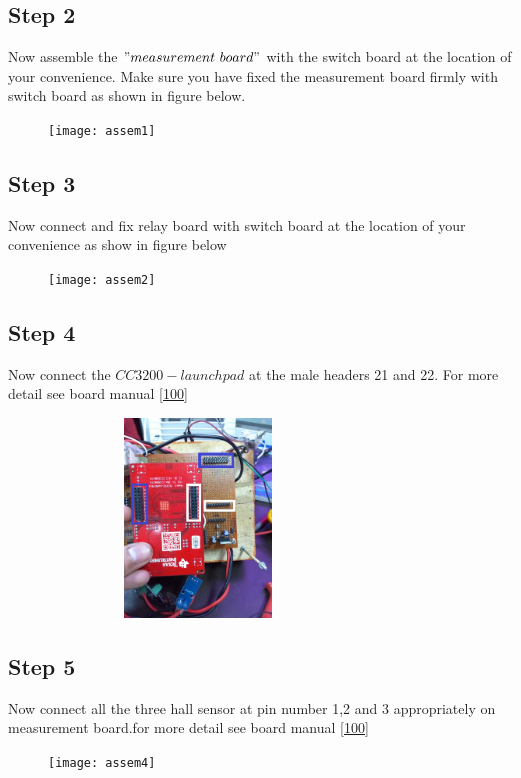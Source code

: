 \documentclass[a4paper,12pt,oneside]{book}
\begin{document}
\subsection*{Step 2}
Now assemble the $"measurement\ board"$ with the switch board at the location of your convenience. Make sure you have fixed the measurement board firmly with switch board as shown in figure below. 
\begin{figure}[h]
	\texttt{[image: assem1]}
\end{figure}
\subsection*{Step 3}
Now connect and fix relay board with switch board at the location of your convenience as show in figure below
\begin{figure}[h]
	\texttt{[image: assem2]}
\end{figure}
\newpage
\subsection*{Step 4}
Now connect the $CC3200-launchpad$ at the male headers 21 and 22. For more detail see board manual \autoref{100}
\begin{figure}[h]
	\includegraphics[width=300px,height=200px]{assem3}
\end{figure}
\subsection*{Step 5}
Now connect all the three hall sensor at pin number 1,2 and 3 appropriately on measurement board.for more detail see board manual \autoref{100}
\begin{figure}[h]
	\texttt{[image: assem4]}
\end{figure}
\end{document}
